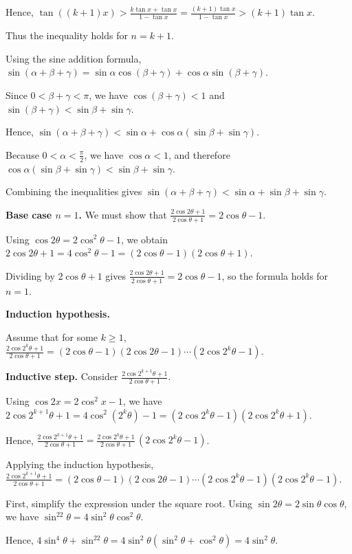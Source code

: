   Hence, $\tan((k+1)x) >\frac{k\tan x+\tan x}{1-\tan x} =\frac{(k+1)\tan x}{1-\tan x} >(k+1)\tan x$.

  Thus the inequality holds for $n=k+1$.
\item Using the sine addition formula, $\sin(\alpha+\beta+\gamma)
  =\sin\alpha\cos(\beta+\gamma)+\cos\alpha\sin(\beta+\gamma)$.

  Since $0<\beta+\gamma<\pi$, we have $\cos(\beta+\gamma)<1$ and $\sin(\beta+\gamma)<\sin\beta+\sin\gamma$.

  Hence,
  $\sin(\alpha+\beta+\gamma) <\sin\alpha+\cos\alpha(\sin\beta+\sin\gamma)$.

  Because $0<\alpha<\frac\pi2$, we have $\cos\alpha<1$, and therefore
  $\cos\alpha(\sin\beta+\sin\gamma)<\sin\beta+\sin\gamma$.

  Combining the inequalities gives
  $\sin(\alpha+\beta+\gamma) < \sin\alpha+\sin\beta+\sin\gamma$.
\item {\bf Base case $n=1$.}
  We must show that
  $\frac{2\cos2\theta+1}{2\cos\theta+1}=2\cos\theta-1$.

  Using $\cos2\theta=2\cos^2\theta-1$, we obtain
  $2\cos2\theta+1=4\cos^2\theta-1=(2\cos\theta-1)(2\cos\theta+1)$.

  Dividing by $2\cos\theta+1$ gives $\frac{2\cos2\theta+1}{2\cos\theta+1}=2\cos\theta-1$,
  so the formula holds for $n=1$.

  {\bf Induction hypothesis.}

  Assume that for some $k\ge1$, $\frac{2\cos2^k\theta+1}{2\cos\theta+1}
  =(2\cos\theta-1)(2\cos2\theta-1)\cdots(2\cos2^k\theta-1)$.

  {\bf Inductive step.}
  Consider $\frac{2\cos2^{k+1}\theta+1}{2\cos\theta+1}$.

  Using $\cos2x=2\cos^2x-1$, we have $2\cos2^{k+1}\theta+1 =4\cos^2(2^k\theta)-1
  =(2\cos2^k\theta-1)(2\cos2^k\theta+1)$.

  Hence, $\frac{2\cos2^{k+1}\theta+1}{2\cos\theta+1}
  =\frac{2\cos2^k\theta+1}{2\cos\theta+1}\,(2\cos2^k\theta-1)$.

  Applying the induction hypothesis, $\frac{2\cos2^{k+1}\theta+1}{2\cos\theta+1}
  =(2\cos\theta-1)(2\cos2\theta-1)\cdots(2\cos2^k\theta-1)(2\cos2^k\theta-1)$.
\item First, simplify the expression under the square root. Using
  $\sin2\theta=2\sin\theta\cos\theta$,
  we have $\sin^22\theta=4\sin^2\theta\cos^2\theta$.

  Hence, $4\sin^4\theta+\sin^22\theta=4\sin^2\theta(\sin^2\theta+\cos^2\theta) =4\sin^2\theta$.

